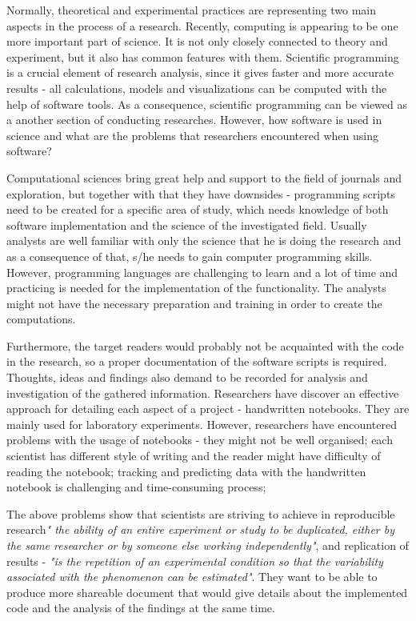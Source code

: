 Normally, theoretical and experimental practices are representing two main aspects in the process of a research. Recently, computing is appearing to be one more important part of science. It is not only closely connected to theory and experiment, but it also has common features with them. Scientific programming is a crucial element of research analysis, since it gives faster and more accurate results - all calculations, models and visualizations can be computed with the help of software tools. As a consequence, scientific programming can be viewed as a another section of conducting researches.\cite{johansson2014introduction} However, how software is used in science and what are the problems that researchers encountered when using software?

Computational sciences bring great help and support to the field of journals and exploration, but together with that they have downsides - programming scripts need to be created for a specific area of study, which needs knowledge of both software implementation and the science of the investigated field. Usually analysts are well familiar with only the science that he is doing the research and as a consequence of that, s/he needs to gain computer programming skills. However, programming languages are challenging to learn and a lot of time and practicing is needed for the implementation of the functionality. The analysts might not have the necessary preparation and training in order to create the computations.  

Furthermore, the target readers would probably not be acquainted with the code in the research, so a proper documentation of the software scripts is required. Thoughts, ideas and findings also demand to be recorded for analysis and investigation of the gathered information. Researchers have discover an effective approach for detailing each aspect of a project - handwritten notebooks. They are mainly used for laboratory experiments. However, researchers have encountered problems with the usage of notebooks - they might not be well organised; each scientist has different style of writing and the reader might have difficulty of reading the notebook; tracking and predicting data with the handwritten notebook is challenging and time-consuming process;

The above problems show that scientists are striving to achieve in reproducible research\textit{" the ability of an entire experiment or study to be duplicated, either by the same researcher or by someone else working independently"}, and replication of results - \textit{"is the repetition of an experimental condition so that the variability associated with the phenomenon can be estimated"}. \cite{reproducibilityWiki} \cite{replicationWiki} They want to be able to produce more shareable document that would give details about the implemented code and the analysis of the findings at the same time. 


